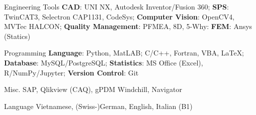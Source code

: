 

\begin{cvskills}


  \cvskill
    {Engineering Tools} %
    {\textbf{CAD}: UNI NX, Autodesk Inventor/Fusion 360; 
    \newline \textbf{SPS}: TwinCAT3, Selectron CAP1131, CodeSys;
    \newline \textbf{Computer Vision}: OpenCV4, MVTec HALCON;
    \newline \textbf{Quality Management}: PFMEA, 8D, 5-Why:
  \newline \textbf{FEM}: Ansys (Statics)} %

%

  \cvskill
    {Programming} %
    {\textbf{Language}: Python, MatLAB; C/C++, Fortran, VBA, LaTeX; 
      \newline \textbf{Database}: MySQL/PostgreSQL;
      \newline \textbf{Statistics}: MS Office (Excel), R/NumPy/Jupyter;
      \newline \textbf{Version Control}: Git
      } %

  \cvskill
    {Misc.} %
    {SAP, Qlikview (CAQ), gPDM Windchill, Navigator} %

  \cvskill
    {Language} %
    {Vietnamese, (Swiss-)German, English, Italian (B1)} %

\end{cvskills}
